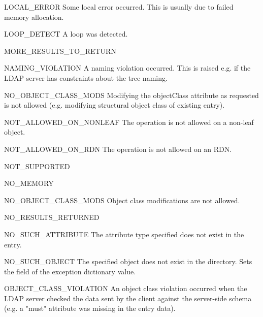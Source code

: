 \begin{excdesc}{LOCAL_ERROR}
Some local error occurred. This is usually due to failed memory allocation.
\end{excdesc}
\begin{excdesc}{LOOP_DETECT}
A loop was detected.
\end{excdesc}
\begin{excdesc}{MORE_RESULTS_TO_RETURN}

\end{excdesc}
\begin{excdesc}{NAMING_VIOLATION}
A naming violation occurred. This is raised e.g. if the LDAP server
has constraints about the tree naming.
\end{excdesc}
\begin{excdesc}{NO_OBJECT_CLASS_MODS}
Modifying the objectClass attribute as requested is not allowed
(e.g. modifying structural object class of existing entry).
\end{excdesc}
\begin{excdesc}{NOT_ALLOWED_ON_NONLEAF}
The operation is not allowed on a non-leaf object.
\end{excdesc}
\begin{excdesc}{NOT_ALLOWED_ON_RDN}
The operation is not allowed on an RDN.
\end{excdesc}
\begin{excdesc}{NOT_SUPPORTED}

\end{excdesc}
\begin{excdesc}{NO_MEMORY}

\end{excdesc}
\begin{excdesc}{NO_OBJECT_CLASS_MODS}
Object class modifications are not allowed.
\end{excdesc}
\begin{excdesc}{NO_RESULTS_RETURNED}

\end{excdesc}
\begin{excdesc}{NO_SUCH_ATTRIBUTE}
The attribute type specified does not exist in the entry.
\end{excdesc}
\begin{excdesc}{NO_SUCH_OBJECT}
The specified object does not exist in the directory.
Sets the  field of the exception dictionary value.
\end{excdesc}
\begin{excdesc}{OBJECT_CLASS_VIOLATION}
An object class violation occurred when the LDAP server checked
the data sent by the client against the server-side schema
(e.g. a "must" attribute was missing in the entry data).
\end{excdesc}
